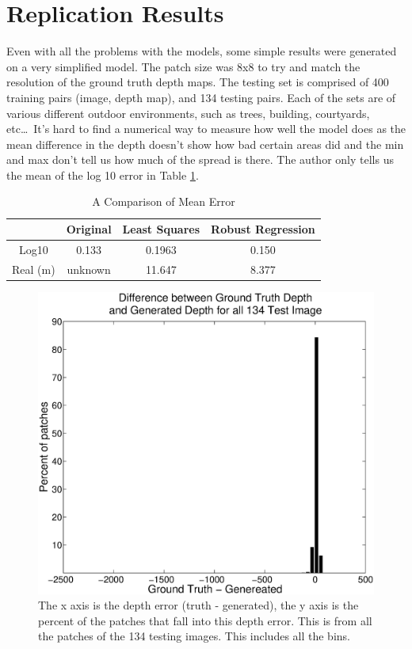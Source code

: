 \documentclass[journal]{IEEEtran}
\begin{document}
\section{Replication Results}
Even with all the problems with the models, some simple results were generated on a very simplified model. The patch size was 8x8 to try and match the resolution of the ground truth depth maps. The testing set is comprised of 400 training pairs (image, depth map), and 134 testing pairs. Each of the sets are of various different outdoor environments, such as trees, building, courtyards, etc\dots~It's hard to find a numerical way to measure how well the model does as the mean difference in the depth doesn't show how bad certain areas did and the min and max don't tell us how much of the spread is there. The author only tells us the mean of the log 10 error in Table \ref{tb:mean}.

\begin{table}[!t]
	\renewcommand{\arraystretch}{1.3}
	\caption{A Comparison of Mean Error}
	\label{tb:mean}
	\centering
	\begin{tabular}{c|c|c|c}
	\hline
	\bfseries  & Original & Least Squares & Robust Regression \\
	\hline\hline
	Log10 & 0.133 & 0.1963 & 0.150\\
	\hline
	Real (m)  & unknown & 11.647 & 8.377\\ 
	\hline
	\end{tabular}
\end{table}

\begin{figure}
\label{fig:histogramall10}
\includegraphics[width=\linewidth]{histogramall10.eps}
\caption{The x axis is the depth error (truth - generated), the y axis is the percent of the patches that fall into this depth error. This is from all the patches of the 134 testing images. This includes all the bins.}
\end{figure}
\end{document}
